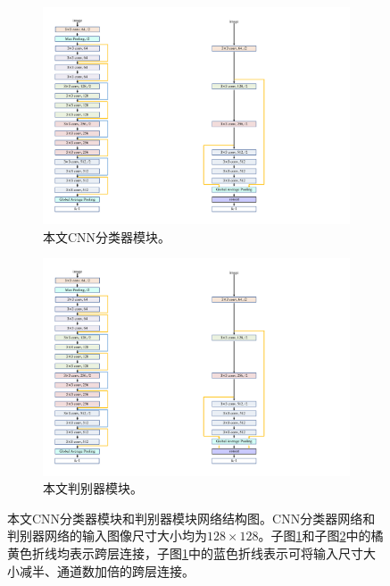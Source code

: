 \begin{figure}[h!]
	\centering
	\begin{subfigure}{0.3\textwidth}
		\centering
		\includegraphics[width=1.0\textwidth]{figure/classifier_architecture.pdf}
		\caption{本文CNN分类器模块。}
		\label{subfig:classifier_architecture}
	\end{subfigure}
	\qquad\qquad\qquad\qquad
	\begin{subfigure}{0.348\textwidth}
		\centering
		\includegraphics[width=1.0\textwidth]{figure/discrimintor_architecture.pdf}
		\caption{本文判别器模块。}
		\label{subfig:discrimintor_architecture}
	\end{subfigure}
	\caption[本文CNN分类器模块和判别器模块网络结构图]{本文CNN分类器模块和判别器模块网络结构图。CNN分类器网络和判别器网络的输入图像尺寸大小均为$128\times 128$。子图\ref{subfig:classifier_architecture}和子图\ref{subfig:discrimintor_architecture}中的橘黄色折线均表示跨层连接，子图\ref{subfig:classifier_architecture}中的蓝色折线表示可将输入尺寸大小减半、通道数加倍的跨层连接。}
	\label{mul_fig:classifier_and_discrimintor_architecture}
\end{figure}
